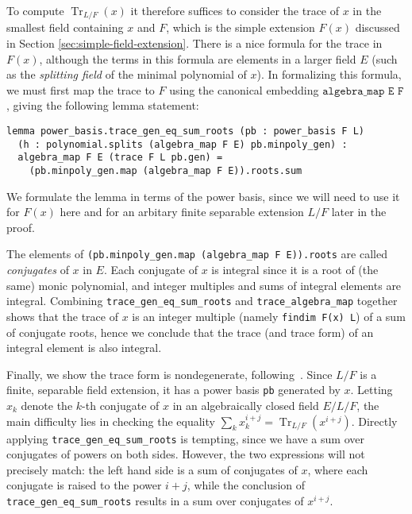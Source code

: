 \documentclass[a4paper,USenglish,cleveref, autoref, thm-restate]{lipics-v2021}
\newcommand{\lean}[1]{\texttt{#1}\xspace} %
\DeclareMathOperator{\Tr}{Tr}
\begin{document}
To compute $\Tr_{L/F}(x)$ it therefore suffices to consider the trace of $x$ in the smallest field containing $x$ and $F$, which is the simple extension $F(x)$ discussed in Section \ref{sec:simple-field-extension}.
There is a nice formula for the trace in $F(x)$, although the terms in this formula are elements in a larger field $E$
(such as the \emph{splitting field} of the minimal polynomial of $x$).
In formalizing this formula, we must first map the trace to $F$ using the canonical embedding $\lean{algebra\_map E F}$,
giving the following lemma statement:
\begin{lstlisting}
lemma power_basis.trace_gen_eq_sum_roots (pb : power_basis F L)
  (h : polynomial.splits (algebra_map F E) pb.minpoly_gen) :
  algebra_map F E (trace F L pb.gen) =
    (pb.minpoly_gen.map (algebra_map F E)).roots.sum
\end{lstlisting}
We formulate the lemma in terms of the power basis, since we will need to use it for $F(x)$ here
and for an arbitary finite separable extension $L / F$ later in the proof.

The elements of \lean{(pb.minpoly\_gen.map (algebra\_map F E)).roots} are called \emph{conjugates} of $x$ in $E$.
Each conjugate of $x$ is integral since it is a root of (the same) monic polynomial,
and integer multiples and sums of integral elements are integral.
Combining \lean{trace\_gen\_eq\_sum\_roots} and \lean{trace\_algebra\_map} together shows that the trace of $x$ is an integer multiple (namely \lean{findim F(x) L}) of a sum of conjugate roots, hence we conclude that the trace (and trace form) of an integral element is also integral.

Finally, we show the trace form is nondegenerate, following~\cite[Proposition~2.8]{Neukirch}.
Since $L / F$ is a finite, separable field extension, it has a power basis \lean{pb} generated by $x$.
Letting $x_k$ denote the $k$-th conjugate of $x$ in an algebraically closed field $E / L / F$,
the main difficulty lies in checking the equality $\sum_k x_k^{i + j} = \Tr_{L / F} (x^{i + j})$.
Directly applying \lean{trace\_gen\_eq\_sum\_roots} is tempting, since we have a sum over conjugates of powers on both sides.
However, the two expressions will not precisely match: the left hand side is a sum of conjugates of $x$, where each conjugate is raised to the power $i + j$,
while the conclusion of \lean{trace\_gen\_eq\_sum\_roots} results in a sum over conjugates of $x^{i + j}$.
\end{document}
